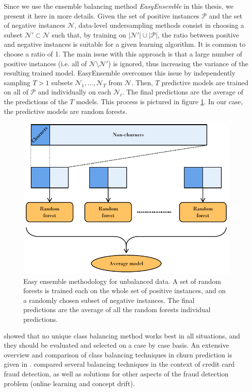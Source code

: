 Since we use the ensemble balancing method \emph{EasyEnsemble}
\parencite{liu2009exploratory} in this thesis, we present it here in more
details. Given the set of positive instances $\mathcal P$ and the set of
negative instances $\mathcal N$, data-level undersampling methods consist in
choosing a subset $\mathcal N'\subset \mathcal N$ such that, by training on
$|\mathcal N'|\cup|\mathcal P|$, the ratio between positive and negative
instances is suitable for a given learning algorithm. It is common to choose a
ratio of 1. The main issue with this approach is that a large number of positive
instances (i.e. all of $\mathcal N \setminus \mathcal N'$) is ignored, thus
increasing the variance of the resulting trained model. EasyEnsemble overcomes
this issue by independently sampling $T>1$ subsets $\mathcal N_1,\dots,\mathcal
N_T$ from $\mathcal N$. Then, $T$ predictive models are trained on all of
$\mathcal P$ and individually on each $\mathcal N_i$. The final predictions are
the average of the predictions of the $T$ models. This process is pictured in
figure \ref{fig:easy_ensemble_diagram}. In our case, the predictive models are
random forests.

\begin{figure}
    \centering
	\includegraphics[width=0.9\linewidth]{figures/easy_ensemble_diagram.pdf}
	\caption{Easy ensemble methodology for unbalanced data. A set of random
	forests is trained each on the whole set of positive instances, and on a
	randomly chosen subset of negative instances. The final predictions are
	the average of all the random forests individual predictions.}
	\label{fig:easy_ensemble_diagram}
\end{figure}

\textcite{dal2013racing} showed that no unique class balancing method works best
in all situations, and they should be evaluated and selected on a case by
case basis. An extensive overview and comparison of class balancing techniques
in churn prediction is given in \parencite{zhu2017empirical}.
\textcite{dal2014learned} compared several balancing techniques in the context
of credit card fraud detection, as well as solutions for other aspects of the
fraud detection problem (online learning and concept drift).

